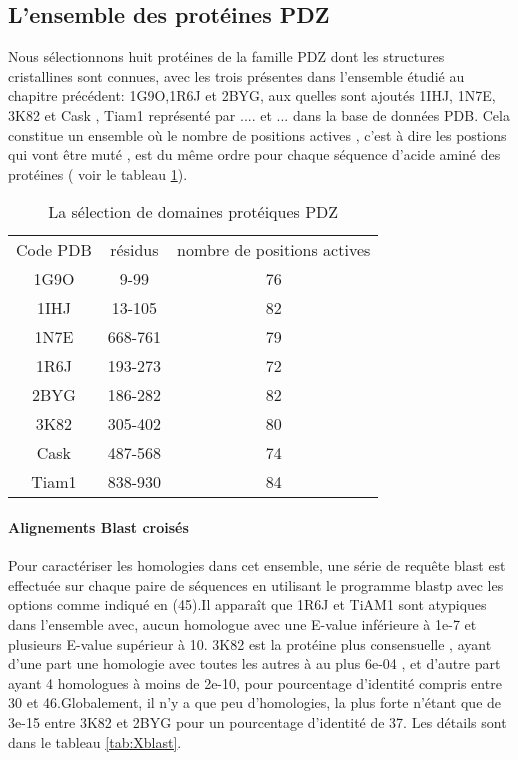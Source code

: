 \begin{enumarete}
\section{L'ensemble des protéines PDZ}

Nous sélectionnons huit protéines de la famille PDZ dont les structures cristallines sont connues, avec les trois présentes dans l'ensemble étudié au chapitre précédent: 1G9O,1R6J et 2BYG, aux quelles sont ajoutés 1IHJ, 1N7E, 3K82 et Cask , Tiam1 représenté par .... et ... dans la base de données PDB. Cela constitue un ensemble où le nombre de positions actives , c'est à dire les postions qui vont être muté , est du même ordre pour chaque séquence d'acide aminé des protéines ( voir le tableau \ref{tab:protéines_PDZ}).



    \begin{table}[!htbp]
      \centering

      \begin{tabular}{ccc}

        \toprule
        Code PDB & résidus & nombre de positions actives\\
        \cmidrule{1-3}
        1G9O  & 	9-99	 & 	76	 \\
        1IHJ  & 	13-105	 & 	82	 \\
        1N7E  & 	668-761	 & 	79	 \\
        1R6J  & 	193-273	 & 	72	 \\
        2BYG  & 	186-282	 & 	82	 \\
        3K82  & 	305-402	 & 	80	 \\
        Cask  & 	487-568	 & 	74	 \\
        Tiam1 & 	838-930	 & 	84	 \\
        \bottomrule

      \end{tabular}      
      \caption{La sélection de domaines protéiques PDZ}
\label{tab:protéines_PDZ}      
    \end{table}




\paragraph{Alignements Blast croisés}
Pour caractériser les homologies dans cet ensemble, une série de requête blast est effectuée sur chaque paire de séquences en utilisant le programme blastp avec les options comme indiqué en (45).Il apparaît que 1R6J et TiAM1 sont atypiques dans l'ensemble avec, aucun homologue avec une E-value inférieure à 1e-7 et plusieurs E-value supérieur à 10. 3K82 est la protéine plus consensuelle , ayant d'une part une homologie avec toutes les autres à au plus 6e-04 , et d'autre part ayant 4 homologues à moins de 2e-10, pour pourcentage d'identité compris entre 30 et 46.Globalement, il n'y a que peu d'homologies, la plus forte n'étant que de 3e-15 entre 3K82 et 2BYG pour un pourcentage d'identité de 37. Les détails sont dans le tableau \ref{tab:Xblast}.



\end{enumarete}

